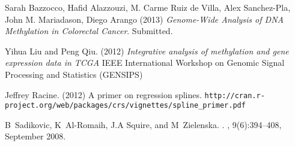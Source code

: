 \vspace{-5mm}
\begin{thebibliography}{9}
%




 Sarah Bazzocco, Hafid Alazzouzi, M. Carme Ruiz de Villa, Alex Sanchez-Pla, John M. Mariadason, Diego Arango (2013) \emph{Genome-Wide Analysis of DNA Methylation in Colorectal Cancer}. Submitted.

 Yihua Liu and Peng Qiu. (2012) \emph{Integrative analysis of methylation and gene expression data in TCGA} IEEE International Workshop on Genomic Signal Processing and Statistics (GENSIPS)

 Jeffrey Racine. (2012) A primer on regression splines.\newline
\verb|http://cran.r-project.org/web/packages/crs/vignettes/spline_primer.pdf|

B~Sadikovic, K~Al-Romaih, J.A Squire, and M~Zielenska.
.
, 9(6):394--408, September 2008.

\end{thebibliography}
